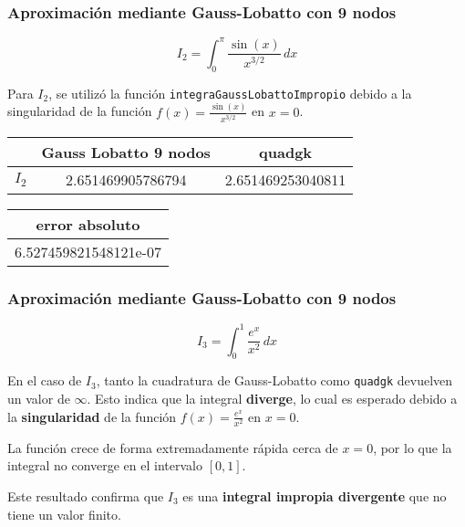 \documentclass{beamer}
\begin{document}
\begin{frame} 
\frametitle{Aproximación mediante Gauss-Lobatto con 9 nodos}

\[
\displaystyle I_2 = \int_{0}^{\pi} \! \frac{\sin(x)}{x^{3/2}} \, dx
\]

Para \( I_2 \), se utilizó la función \texttt{integraGaussLobattoImpropio} debido a la singularidad de la función \( f(x) = \frac{\sin(x)}{x^{3/2}} \) en \( x = 0 \).

\vspace{1em}

\begin{table}[h]
    \centering
    \begin{tabular}{|c|c|c|}
        \hline
        \rowcolor{gray!30}
         & Gauss Lobatto 9 nodos & quadgk \\
        \hline
         $I_2$ & 2.651469905786794 & 2.651469253040811 \\
        \hline
    \end{tabular}
\end{table}

\vspace{0.5em}

\begin{table}[h]
    \centering
    \begin{tabular}{|c|}
        \hline
        \rowcolor{gray!30}
         error absoluto \\
        \hline
         6.527459821548121e-07 \\
        \hline
    \end{tabular}
\end{table}
\end{frame}


\begin{frame}
\frametitle{Aproximación mediante Gauss-Lobatto con 9 nodos}

\[
\displaystyle I_3 = \int_{0}^{1} \! \frac{e^x}{x^2} \, dx
\]

\vspace{1em}

En el caso de \( I_3 \), tanto la cuadratura de Gauss-Lobatto como \texttt{quadgk} devuelven un valor de \( \infty \).  
Esto indica que la integral \textbf{diverge}, lo cual es esperado debido a la \textbf{singularidad} de la función  
\( f(x) = \frac{e^x}{x^2} \) en \( x = 0 \).

\vspace{0.5em}

La función crece de forma extremadamente rápida cerca de \( x = 0 \), por lo que la integral no converge en el intervalo \( [0, 1] \).

\vspace{0.5em}

Este resultado confirma que \( I_3 \) es una \textbf{integral impropia divergente} que no tiene un valor finito.
\end{frame}
\end{document}

